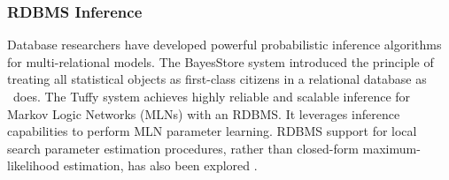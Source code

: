 \subsubsection{RDBMS Inference} 
Database researchers have developed powerful probabilistic inference  algorithms for multi-relational models. 
 The BayesStore system \cite{Wang2008} introduced the principle of treating all statistical objects as first-class citizens in a relational database as \FB\ does. The Tuffy system \cite{Niu2011} achieves highly reliable and scalable inference for Markov Logic Networks (MLNs) with an RDBMS. It leverages inference capabilities to perform MLN parameter learning. RDBMS support for local search parameter estimation procedures, rather than closed-form maximum-likelihood estimation, has also been explored \cite{Feng_SIGMOD_2012,Niu2011,Niu2011a}.


